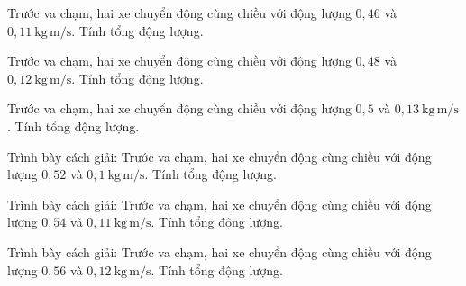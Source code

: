 \begin{ex}
Trước va chạm, hai xe chuyển động cùng chiều với động lượng $0,46$ và $0,11\ \mathrm{kg\,m/s}$. Tính tổng động lượng.
\end{ex}

\begin{ex}
Trước va chạm, hai xe chuyển động cùng chiều với động lượng $0,48$ và $0,12\ \mathrm{kg\,m/s}$. Tính tổng động lượng.
\end{ex}

\begin{ex}
Trước va chạm, hai xe chuyển động cùng chiều với động lượng $0,5$ và $0,13\ \mathrm{kg\,m/s}$. Tính tổng động lượng.
\end{ex}

\begin{bt}
Trình bày cách giải: Trước va chạm, hai xe chuyển động cùng chiều với động lượng $0,52$ và $0,1\ \mathrm{kg\,m/s}$. Tính tổng động lượng.
\end{bt}

\begin{bt}
Trình bày cách giải: Trước va chạm, hai xe chuyển động cùng chiều với động lượng $0,54$ và $0,11\ \mathrm{kg\,m/s}$. Tính tổng động lượng.
\end{bt}

\begin{bt}
Trình bày cách giải: Trước va chạm, hai xe chuyển động cùng chiều với động lượng $0,56$ và $0,12\ \mathrm{kg\,m/s}$. Tính tổng động lượng.
\end{bt}


